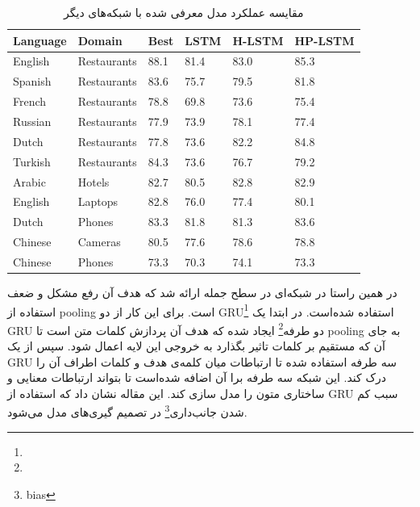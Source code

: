 \documentclass[12pt, a4paper, oneside]{report}
\begin{document}
\begin{table}[!ht]
    \begin{small}
    \begin{center}
      \begin{latin}
      \begin{tabular}{|l|l|l|l|l|l|}
        \hline
        Language & Domain & Best & LSTM & H-LSTM &  HP-LSTM \\
        \hline
        English & Restaurants & 88.1 & 81.4 & 83.0 & 85.3 \\
        \hline
        Spanish & Restaurants & 83.6 & 75.7 & 79.5 & 81.8 \\
        \hline
        French & Restaurants & 78.8 & 69.8 & 73.6 & 75.4 \\
        \hline
        Russian & Restaurants & 77.9 & 73.9 & 78.1 & 77.4 \\
        \hline
        Dutch & Restaurants & 77.8 & 73.6 & 82.2 & 84.8 \\
        \hline
        Turkish & Restaurants & 84.3 & 73.6 & 76.7 & 79.2 \\
        \hline
        Arabic & Hotels & 82.7 & 80.5 & 82.8 & 82.9 \\
        \hline
        English & Laptops & 82.8 & 76.0 & 77.4 & 80.1 \\
        \hline
        Dutch & Phones & 83.3 & 81.8 & 81.3 & 83.6 \\
        \hline
        Chinese & Cameras & 80.5 & 77.6 & 78.6 & 78.8 \\
        \hline
        Chinese & Phones & 73.3 & 70.3 & 74.1 & 73.3 \\
        \hline
      \end{tabular}
      \end{latin}
      \caption{مقایسه عملکرد مدل معرفی شده با شبکه‌های دیگر}
      \label{tab:H-LSTM}
    \end{center}
\end{small}
  \end{table}

در همین راستا در
\cite{72Zhang_Zhang_Vo_2016}
شبکه‌ای در سطح جمله ارائه شد که هدف آن رفع مشکل و ضعف استفاده از
pooling
است. برای این کار از دو
GRU\footnote{}
استفاده شده‌است. در ابتدا یک
GRU
دو طرفه\footnote{}
ایجاد شده که هدف آن پردازش کلمات متن است تا
pooling
به جای آن که مستقیم بر کلمات تاثیر بگذارد به خروجی این لایه اعمال شود. سپس از یک
GRU
سه طرفه استفاده شده تا ارتباطات میان کلمه‌ی هدف و کلمات اطراف آن را درک کند.
این شبکه سه طرفه برا آن اضافه شده‌است تا بتواند ارتباطات معنایی و ساختاری متون را مدل سازی کند.
این مقاله نشان داد که استفاده از
GRU
سبب کم شدن جانب‌داری\footnote{bias}
در تصمیم گیری‌های مدل می‌شود.
\end{document}

